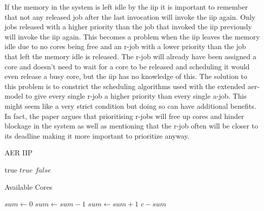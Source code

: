 \documentclass{kththesis}
\begin{document}
If the memory in the system is left idle by the \acrshort{iip} it is important to remember that
not any released job after the last invocation will invoke the \acrshort{iip} again. Only jobs
released with a higher priority than the job that invoked the \acrshort{iip} previously will invoke
the \acrshort{iip} again. This becomes a problem when the \acrshort{iip} leaves the memory idle due
to no cores being free and an \acrshort{r}-job with a lower priority than the job that left the
memory idle is released. The \acrshort{r}-job will already have been assigned a core and doesn't
need to wait for a core to be released and scheduling it would even release a busy core, but the
\acrshort{iip} has no knowledge of this. The solution to this problem is to constrict the scheduling
algorithms used with the extended \acrshort{aer}-model to give every single \acrshort{r}-job a
higher priority than every single \acrshort{a}-job. This might seem like a very strict condition but
doing so can have additional benefits. In fact, the paper \parencite{becker_contention-free_2016}
argues that prioritising \acrshort{r}-jobs will free up cores and hinder blockage in the system as
well as mentioning that the \acrshort{r}-job often will be closer to its deadline making it more
important to prioritize anyway.

\begin{algorithm}
    \caption{AER IIP}
    \label{algo:aer_iip}
    \begin{algorithmic}[1]
                \State \Return true
            \Else
                    \State \Return $true$
                \Else
                    \State \Return $false$
                \EndIf
            \EndIf
        \EndFunction
    \end{algorithmic}
\end{algorithm}

\begin{algorithm}
    \caption{Available Cores}
    \label{algo:available_cores}
    \begin{algorithmic}[1]
            \State $sum\gets 0$
                    \State $sum\gets sum-1$
                    \State $sum\gets sum+1$
                \EndIf
            \EndFor
            \State \Return $c - sum$
        \EndFunction
    \end{algorithmic}
\end{algorithm}
\end{document}
